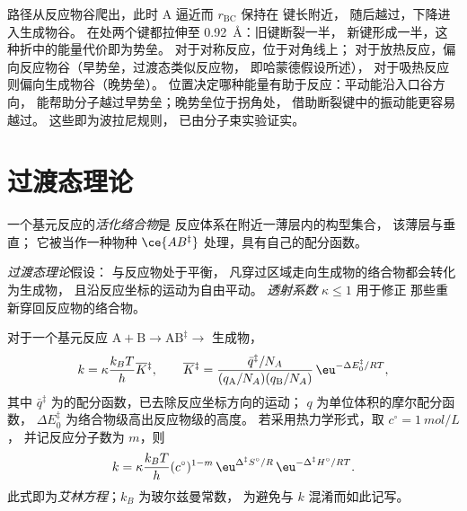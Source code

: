 路径从反应物谷爬出，此时 A 逼近而 $r_{\mathrm{BC}}$ 保持在  键长附近，
随后越过，下降进入生成物谷。
在处两个键都拉伸至 \qty{0.92}{\angstrom}：旧键断裂一半，
新键形成一半，这种折中的能量代价即为势垒。
对于对称反应，位于对角线上；
对于放热反应，偏向反应物谷（早势垒，过渡态类似反应物，
即哈蒙德假设所述），
对于吸热反应则偏向生成物谷（晚势垒）。
位置决定哪种能量有助于反应：平动能沿入口谷方向，
能帮助分子越过早势垒；晚势垒位于拐角处，
借助断裂键中的振动能更容易越过。
这些即为波拉尼规则，
已由分子束实验证实。

\section{过渡态理论}

\begin{definition}[活化络合物]\label{def:b3:rate-theories:activated-complex}
一个基元反应的\emph{活化络合物}是
反应体系在附近一薄层内的构型集合，
该薄层与垂直；
它被当作一种物种 $\ce{AB^{\ddagger}}$ 处理，具有自己的配分函数。
\end{definition}

\begin{definition}\label{def:b3:rate-theories:tst}
\emph{过渡态理论}假设：
与反应物处于平衡，
凡穿过区域走向生成物的络合物都会转化为生成物，
且沿反应坐标的运动为自由平动。
\emph{透射系数} $\kappa \le 1$ 用于修正
那些重新穿回反应物的络合物。
\end{definition}

\begin{theorem}[艾林方程]\label{thm:b3:rate-theories:eyring}
对于一个基元反应 $\mathrm{A + B} \to \mathrm{AB}^{\ddagger} \to$ 生成物，
\[
  k = \kappa\frac{k_BT}{h}\overline{K}{}^{\ddagger}, \qquad
  \overline{K}{}^{\ddagger} = \frac{\bar q^{\ddagger}/N_A}{(q_{\mathrm A}/N_A)(q_{\mathrm B}/N_A)}\,\eu^{-\Delta E_0^{\ddagger}/RT},
\]
其中 $\bar q^{\ddagger}$ 为的配分函数，已去除反应坐标方向的运动；
$q$ 为单位体积的摩尔配分函数，
$\Delta E_0^{\ddagger}$ 为络合物级高出反应物级的高度。
若采用热力学形式，取 $c^\circ = \qty{1}{mol/L}$，
并记反应分子数为 $m$，则
\[
  k = \kappa\frac{k_BT}{h}(c^\circ)^{1-m}\,\eu^{\Delta^{\ddagger}S^\circ/R}\,\eu^{-\Delta^{\ddagger}H^\circ/RT}.
\]
此式即为\emph{艾林方程}；$k_B$ 为玻尔兹曼常数，
为避免与 $k$ 混淆而如此记写。
\end{theorem}


